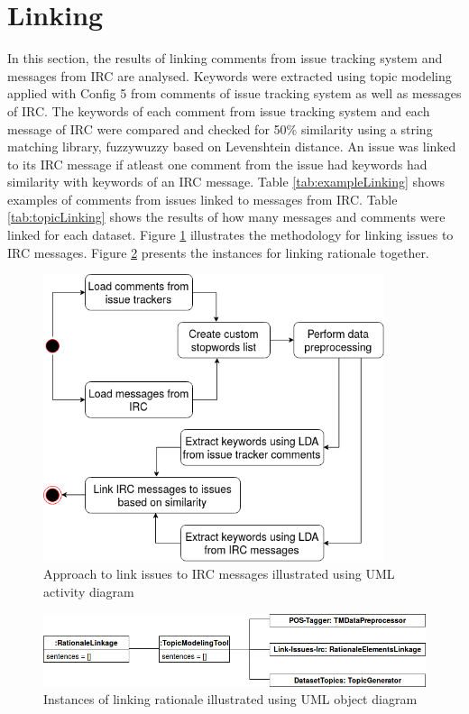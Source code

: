 \documentclass[a4paper,12pt,twoside]{report}
\begin{document}
\section{Linking}
In this section, the results of linking comments from issue tracking system and messages from \acs{IRC} are analysed. Keywords were extracted using topic modeling applied with Config 5 from comments of issue tracking system as well as messages of \acs{IRC}. The keywords of each comment from issue tracking system and each message of \acs{IRC} were compared and checked for 50\% similarity using a string matching library, fuzzywuzzy based on Levenshtein distance. An issue was linked to its \acs{IRC} message if atleast one comment from the issue had keywords had similarity with keywords of an \acs{IRC} message. Table \ref{tab:exampleLinking} shows examples of comments from issues linked to messages from \acs{IRC}. Table \ref{tab:topicLinking} shows the results of how many messages and comments were linked for each dataset. Figure \ref{fig:topiclinkingClass} illustrates the methodology for linking issues to \acs{IRC} messages. Figure \ref{fig:instanceLink} presents the instances for linking rationale together.

\begin{figure}[h] %
    \centering
    \includegraphics[width=10cm]{topic-linking}
    \caption{Approach to link issues to \acs{IRC} messages illustrated using UML activity diagram}
    \label{fig:topiclinkingClass}
\end{figure}

\begin{figure}[h] %
    \centering
    \includegraphics[width=13cm]{rationale-linkage-object}
    \caption{Instances of linking rationale illustrated using UML object diagram}
    \label{fig:instanceLink}
\end{figure}
\end{document}
